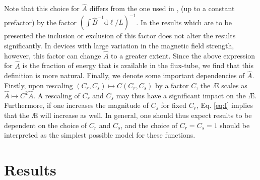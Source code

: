 Note that this choice for $\widehat{A}$ differs from the one used in \citep{Mackenbach2022AvailableTransport}, (up to a constant prefactor) by the factor $(\int \hat{B}^{-1} \mathrm{d} \ell / L)^{-1}$. In the results which are to be presented the inclusion or exclusion of this factor does not alter the results significantly. In devices with large variation in the magnetic field strength, however, this factor can change $\widehat{A}$ to a greater extent. Since the above expression for $\widehat{A}$ is the fraction of energy that is available in the flux-tube, we find that this definition is more natural. Finally, we denote some important dependencies of $\widehat{A}$. Firstly, upon rescaling $(C_r,C_s) \mapsto C (C_r,C_s)$ by a factor $C$, the \AE{} scales as $\widehat{A} \mapsto C^2 \widehat{A}$. A rescaling of $C_r$ and $C_s$ may thus have a significant impact on the \AE{}. Furthermore, if one increases the magnitude of $C_s$ for fixed $C_r$, Eq. \eqref{eq:I} implies that the \AE{} will increase as well. In general, one should thus expect results to be dependent on the choice of $C_r$ and $C_s$, and the choice of $C_r=C_s=1$ should be interpreted as the simplest possible model for these functions.

\section{Results} \label{sec:results}
